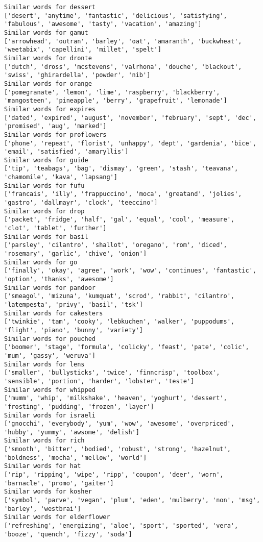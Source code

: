 \documentclass[11pt]{article}
\begin{document}
\begin{Verbatim}[commandchars=\\\{\}]
Similar words for dessert
['desert', 'anytime', 'fantastic', 'delicious', 'satisfying', 'fabulous', 'awesome', 'tasty', 'vacation', 'amazing']
Similar words for gamut
['arrowhead', 'outran', 'barley', 'oat', 'amaranth', 'buckwheat', 'weetabix', 'capellini', 'millet', 'spelt']
Similar words for dronte
['dutch', 'dross', 'mcstevens', 'valrhona', 'douche', 'blackout', 'swiss', 'ghirardella', 'powder', 'nib']
Similar words for orange
['pomegranate', 'lemon', 'lime', 'raspberry', 'blackberry', 'mangosteen', 'pineapple', 'berry', 'grapefruit', 'lemonade']
Similar words for expires
['dated', 'expired', 'august', 'november', 'february', 'sept', 'dec', 'promised', 'aug', 'marked']
Similar words for proflowers
['phone', 'repeat', 'florist', 'unhappy', 'dept', 'gardenia', 'bice', 'email', 'satisfied', 'amaryllis']
Similar words for guide
['tip', 'teabags', 'bag', 'dismay', 'green', 'stash', 'teavana', 'chamomile', 'kava', 'lapsang']
Similar words for fufu
['francais', 'illy', 'frappuccino', 'moca', 'greatand', 'jolies', 'gastro', 'dallmayr', 'clock', 'teeccino']
Similar words for drop
['packet', 'fridge', 'half', 'gal', 'equal', 'cool', 'measure', 'clot', 'tablet', 'further']
Similar words for basil
['parsley', 'cilantro', 'shallot', 'oregano', 'rom', 'diced', 'rosemary', 'garlic', 'chive', 'onion']
Similar words for go
['finally', 'okay', 'agree', 'work', 'wow', 'continues', 'fantastic', 'option', 'thanks', 'awesome']
Similar words for pandoor
['smeagol', 'mizuna', 'kumquat', 'scrod', 'rabbit', 'cilantro', 'latempesta', 'privy', 'basil', 'tsk']
Similar words for cakesters
['twinkie', 'tam', 'cooky', 'lebkuchen', 'walker', 'puppodums', 'flight', 'piano', 'bunny', 'variety']
Similar words for pouched
['boomer', 'stage', 'formula', 'colicky', 'feast', 'pate', 'colic', 'mum', 'gassy', 'weruva']
Similar words for lens
['smaller', 'bullysticks', 'twice', 'finncrisp', 'toolbox', 'sensible', 'portion', 'harder', 'lobster', 'teste']
Similar words for whipped
['mumm', 'whip', 'milkshake', 'heaven', 'yoghurt', 'dessert', 'frosting', 'pudding', 'frozen', 'layer']
Similar words for israeli
['gnocchi', 'everybody', 'yum', 'wow', 'awesome', 'overpriced', 'hubby', 'yummy', 'awsome', 'delish']
Similar words for rich
['smooth', 'bitter', 'bodied', 'robust', 'strong', 'hazelnut', 'boldness', 'mocha', 'mellow', 'world']
Similar words for hat
['rip', 'ripping', 'wipe', 'ripp', 'coupon', 'deer', 'worn', 'barnacle', 'promo', 'gaiter']
Similar words for kosher
['symbol', 'parve', 'vegan', 'plum', 'eden', 'mulberry', 'non', 'msg', 'barley', 'westbrai']
Similar words for elderflower
['refreshing', 'energizing', 'aloe', 'sport', 'sported', 'vera', 'booze', 'quench', 'fizzy', 'soda']

\end{Verbatim}
\end{document}
